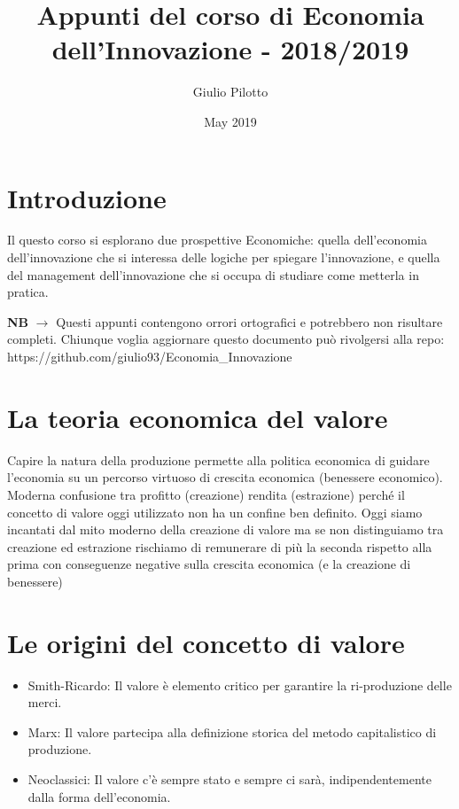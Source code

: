 \documentclass{article}
\title{Appunti del corso di Economia dell'Innovazione - 2018/2019}
\author{Giulio Pilotto}
\date{May 2019}
\begin{document}
\maketitle
\tableofcontents

\newpage
\section{Introduzione}
Il questo corso si esplorano due prospettive Economiche: quella dell'economia dell'innovazione che si interessa delle logiche per spiegare l'innovazione, e quella del management dell'innovazione che si occupa di studiare come metterla in pratica.


\textbf{NB} $\rightarrow$ Questi appunti contengono orrori ortografici e potrebbero non risultare completi. Chiunque voglia aggiornare questo documento può rivolgersi alla repo: https://github.com/giulio93/Economia\_Innovazione

 
\section{La teoria economica del valore}
Capire la natura della produzione permette alla politica economica di guidare l’economia su un percorso virtuoso di crescita economica (benessere economico).
Moderna confusione tra profitto (creazione) rendita
(estrazione) perché il concetto di valore oggi utilizzato
non ha un confine ben definito.
Oggi siamo incantati dal mito moderno della creazione
di valore ma se non distinguiamo tra creazione ed
estrazione rischiamo di remunerare di più la seconda
rispetto alla prima con conseguenze negative sulla
crescita economica (e la creazione di benessere)

\section{Le origini del concetto di valore}
\begin{itemize}
    \item Smith-Ricardo: Il valore è elemento critico per garantire la ri-produzione delle merci.
    \item Marx: Il valore
        partecipa alla definizione storica del metodo capitalistico di
        produzione.
    \item Neoclassici:  Il
valore c’è sempre stato e sempre ci sarà, indipendentemente dalla
forma dell’economia. 
\end{itemize}
\end{document}
